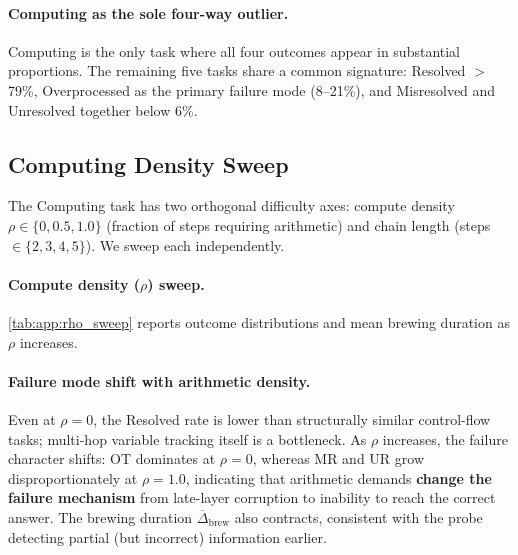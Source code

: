 \paragraph{Computing as the sole four-way outlier.}
Computing is the only task where all four outcomes appear in substantial proportions.
The remaining five tasks share a common signature: Resolved $>$ 79\%, Overprocessed as the primary failure mode (8--21\%), and Misresolved and Unresolved together below 6\%.


\subsection{Computing Density Sweep}
\label{app:subsec:computing_density_sweep}

The Computing task has two orthogonal difficulty axes: compute density $\rho \in \{0, 0.5, 1.0\}$ (fraction of steps requiring arithmetic) and chain length (steps $\in \{2,3,4,5\}$).
We sweep each independently.

\paragraph{Compute density ($\rho$) sweep.}

\cref{tab:app:rho_sweep} reports outcome distributions and mean brewing duration as $\rho$ increases.

\begin{table}[H]
\centering
\caption{Outcome distribution and mean brewing duration ($\Delta_{\mathrm{brew}}$) as a function of compute density $\rho$ for the Computing task (Qwen2.5-Coder-7B, pooled over all chain lengths).}
\label{tab:app:rho_sweep}
\end{table}

\paragraph{Failure mode shift with arithmetic density.}
Even at $\rho{=}0$, the Resolved rate is lower than structurally similar control-flow tasks; multi-hop variable tracking itself is a bottleneck.
As $\rho$ increases, the failure character shifts: OT dominates at $\rho{=}0$, whereas MR and UR grow disproportionately at $\rho{=}1.0$, indicating that arithmetic demands \textbf{change the failure mechanism} from late-layer corruption to inability to reach the correct answer.
The brewing duration $\overline{\Delta}_{\mathrm{brew}}$ also contracts, consistent with the probe detecting partial (but incorrect) information earlier.

